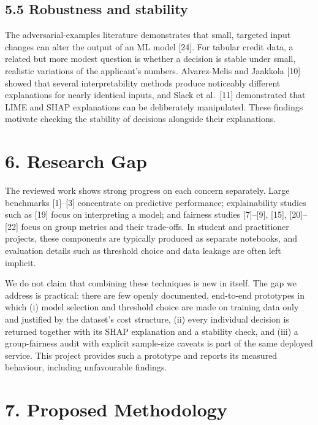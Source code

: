 \documentclass[
  11pt,
]{article}
\begin{document}
\hypertarget{robustness-and-stability}{%
\subsection{5.5 Robustness and
stability}\label{robustness-and-stability}}

The adversarial-examples literature demonstrates that small, targeted
input changes can alter the output of an ML model {[}24{]}. For tabular
credit data, a related but more modest question is whether a decision is
stable under small, realistic variations of the applicant's numbers.
Alvarez-Melis and Jaakkola {[}10{]} showed that several interpretability
methods produce noticeably different explanations for nearly identical
inputs, and Slack et al.~{[}11{]} demonstrated that LIME and SHAP
explanations can be deliberately manipulated. These findings motivate
checking the stability of decisions alongside their explanations.

\hypertarget{research-gap}{%
\section{6. Research Gap}\label{research-gap}}

The reviewed work shows strong progress on each concern separately.
Large benchmarks {[}1{]}--{[}3{]} concentrate on predictive performance;
explainability studies such as {[}19{]} focus on interpreting a model;
and fairness studies {[}7{]}--{[}9{]}, {[}15{]}, {[}20{]}--{[}22{]}
focus on group metrics and their trade-offs. In student and practitioner
projects, these components are typically produced as separate notebooks,
and evaluation details such as threshold choice and data leakage are
often left implicit.

We do not claim that combining these techniques is new in itself. The
gap we address is practical: there are few openly documented, end-to-end
prototypes in which (i) model selection and threshold choice are made on
training data only and justified by the dataset's cost structure, (ii)
every individual decision is returned together with its SHAP explanation
and a stability check, and (iii) a group-fairness audit with explicit
sample-size caveats is part of the same deployed service. This project
provides such a prototype and reports its measured behaviour, including
unfavourable findings.

\hypertarget{proposed-methodology}{%
\section{7. Proposed Methodology}\label{proposed-methodology}}
\end{document}
